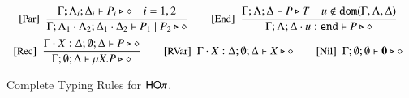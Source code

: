 \begin{figure}[t]
\[\begin{array}{c}
		{\footnotesize[\textrm{\small Par}]}~~\displaystyle \frac { 
			\Gamma; \Lambda_{i}; \Delta_{i} \vdash P_{i} \triangleright \diamond \quad i=1,2
		 }{ 
			\Gamma; \Lambda_{1} \cdot \Lambda_2; \Delta_{1} \cdot \Delta_2 \vdash P_1 \;|\; P_2 \triangleright \diamond
		 } 
		\qquad
		{\footnotesize[\textrm{\small End}]}~~\displaystyle \frac { 
			\Gamma; \Lambda; \Delta  \vdash P \triangleright T \quad u \not\in \mathtt{dom}(\Gamma, \Lambda,\Delta)
		 }{ 
			\Gamma; \Lambda; \Delta \cdot u: \mathtt{end}  \vdash P \triangleright \diamond
		 } 
		\\[4mm]

	 	{\footnotesize[\textrm{\small Rec}]}~~\displaystyle \frac { 
			\Gamma \cdot X: \Delta; \emptyset; \Delta  \vdash P \triangleright \diamond
		 }{ 
			\Gamma ; \emptyset; \Delta  \vdash \mu X. P \triangleright \diamond
		 } 
		\qquad
		{\footnotesize[\textrm{\small RVar}]}~~\Gamma \cdot X: \Delta; \emptyset; \Delta  \vdash X \triangleright \diamond
		\qquad
		{\footnotesize[\textrm{\small Nil}]}~~\Gamma; \emptyset; \emptyset \vdash \mathbf{0} \triangleright \diamond
	\end{array}
\]
\caption{Complete Typing Rules for $\mathsf{HO}\pi$.\label{fig:typerulesmy}}
\end{figure}



